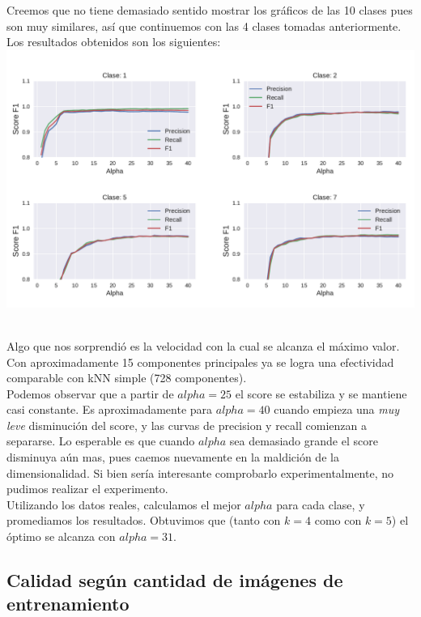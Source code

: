Creemos que no tiene demasiado sentido mostrar los gráficos de las 10 clases pues son muy similares, así que continuemos con las 4 clases tomadas anteriormente. Los resultados obtenidos son los siguientes: \\

{\centering
    \includegraphics[scale=0.65]{informe/imagenes/pca/variacionAlphaClases1257KFijo.pdf} \\
}
$ $\newline

Algo que nos sorprendió es la velocidad con la cual se alcanza el máximo valor. Con aproximadamente 15 componentes principales ya se logra una efectividad comparable con kNN simple (728 componentes). \\

Podemos observar que a partir de $alpha=25$ el score se estabiliza y se mantiene casi constante. Es aproximadamente para $alpha=40$ cuando empieza una \textit{muy leve} disminución del score, y las curvas de precision y recall comienzan a separarse. Lo esperable es que cuando $alpha$ sea demasiado grande el score disminuya aún mas, pues caemos nuevamente en la maldición de la dimensionalidad. Si bien sería interesante comprobarlo experimentalmente, no pudimos realizar el experimento. \\

Utilizando los datos reales, calculamos el mejor $alpha$ para cada clase, y promediamos los resultados. Obtuvimos que (tanto con $k=4$ como con $k=5$) el óptimo se alcanza con $alpha=31$. \\


\subsection{Calidad según cantidad de imágenes de entrenamiento}

